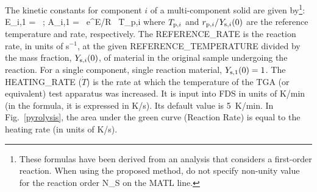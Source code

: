 \documentclass[11pt]{book}
\begin{document}
The kinetic constants for component $i$ of a multi-component solid are given by\footnote{These formulas have been derived from an analysis that considers a first-order reaction. When using the proposed method, do not specify non-unity value for the reaction order {\ct N\_S} on the {\ct MATL} line.}:
\be
   E_{i,1} =  \,  \quad ; \quad
   A_{i,1} =  \, {\rm e}^{E/R \, T_{{\rm p},i}} \label{AandE}
\ee
where $T_{{\rm p},i}$ and $r_{{\rm p},i}/Y_{{\rm s},i}(0)$ are the reference temperature and rate, respectively. The {\ct REFERENCE\_RATE} is the reaction rate, in units of s$^{-1}$, at the given {\ct REFERENCE\_TEMPERATURE} divided by the mass fraction, $Y_{{\rm s},i}(0)$, of material in the original sample undergoing the reaction. For a single component, single reaction material, $Y_{{\rm s},1}(0)=1$. The {\ct HEATING\_RATE} ($\dot{T}$) is the rate at which the temperature of the TGA (or equivalent) test apparatus was increased. It is input into FDS in units of K/min (in the formula, it is expressed in K/s). Its default value is 5~K/min. In Fig.~\ref{pyrolysis}, the area under the green curve (Reaction Rate) is equal to the heating rate (in units of K/s).
\end{document}
